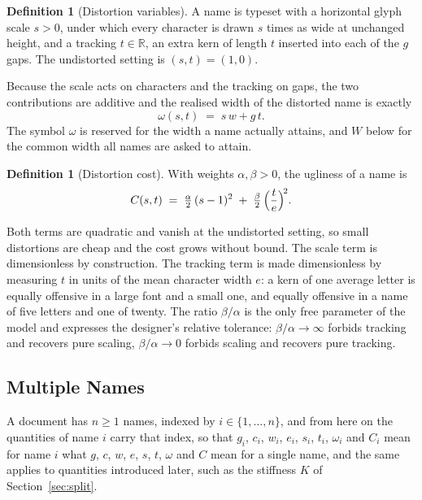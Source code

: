 \documentclass[10pt,twocolumn]{article}
\theoremstyle{plain}
\theoremstyle{definition}
\newtheorem{definition}[proposition]{Definition}
\begin{document}
  \begin{definition}[Distortion variables]
    A name is typeset with a horizontal glyph scale $s > 0$, under which every character is drawn $s$ times as wide at unchanged height, and a tracking $t \in \mathbb{R}$, an extra kern of length $t$ inserted into each of the $g$ gaps.
    The undistorted setting is $(s,t) = (1,0)$.
  \end{definition}

  Because the scale acts on characters and the tracking on gaps, the two contributions are additive and the realised width of the distorted name is exactly
  \begin{equation}
    \omega(s,t) \;=\; s\,w + g\,t .
    \label{eq:width}
  \end{equation}
  The symbol $\omega$ is reserved for the width a name actually attains, and $W$ below for the common width all names are asked to attain.

  \begin{definition}[Distortion cost]
    With weights $\alpha,\beta > 0$, the ugliness of a name is
    \begin{equation}
      C(s,t) \;=\; \tfrac{\alpha}{2}\,(s - 1)^2 \;+\; \tfrac{\beta}{2}\,\Bigl(\frac{t}{e}\Bigr)^{\!2}.
      \label{eq:cost}
    \end{equation}
  \end{definition}

  Both terms are quadratic and vanish at the undistorted setting, so small distortions are cheap and the cost grows without bound.
  The scale term is dimensionless by construction.
  The tracking term is made dimensionless by measuring $t$ in units of the mean character width $e$: a kern of one average letter is equally offensive in a large font and a small one, and equally offensive in a name of five letters and one of twenty.
  The ratio $\beta/\alpha$ is the only free parameter of the model and expresses the designer's relative tolerance: $\beta/\alpha \to \infty$ forbids tracking and recovers pure scaling, $\beta/\alpha \to 0$ forbids scaling and recovers pure tracking.

  \subsection{Multiple Names}
  A document has $n \ge 1$ names, indexed by $i \in \{1,\dots,n\}$, and from here on the quantities of name $i$ carry that index, so that $g_i$, $c_i$, $w_i$, $e_i$, $s_i$, $t_i$, $\omega_i$ and $C_i$ mean for name $i$ what $g$, $c$, $w$, $e$, $s$, $t$, $\omega$ and $C$ mean for a single name, and the same applies to quantities introduced later, such as the stiffness $K$ of Section~\ref{sec:split}.
\end{document}

